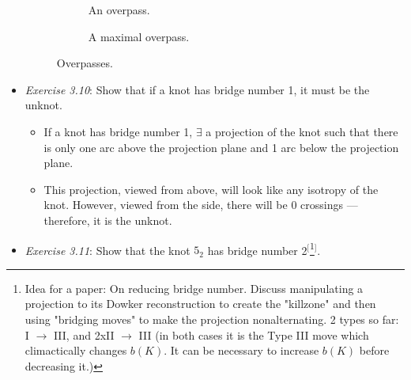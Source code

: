 \documentclass[titlepage]{article}
\numberwithin{figure}{section}
\numberwithin{table}{section}
\numberwithin{equation}{section}
\begin{document}
\begin{itemize}
\begin{figure}[h!]
\begin{subfigure}[b]{0.4\linewidth}
            \caption{An overpass.}
            \label{fig:overpassa}
        \end{subfigure}
        \begin{subfigure}[b]{0.4\linewidth}
            \centering
            \caption{A maximal overpass.}
            \label{fig:overpassb}
        \end{subfigure}
        \caption{Overpasses.}
        \label{fig:overpass}
    \end{figure}
    \item \emph{Exercise 3.10}: Show that if a knot has bridge number 1, it must be the unknot.
    \begin{itemize}
        \item If a knot has bridge number 1, $\exists$ a projection of the knot such that there is only one arc above the projection plane and 1 arc below the projection plane.
        \item This projection, viewed from above, will look like any isotropy of the knot. However, viewed from the side, there will be 0 crossings --- therefore, it is the unknot.
    \end{itemize}
    \item \emph{Exercise 3.11}: Show that the knot $5_2$ has bridge number 2$^[$\footnote{Idea for a paper: On reducing bridge number. Discuss manipulating a projection to its Dowker reconstruction to create the "killzone" and then using "bridging moves" to make the projection nonalternating. 2 types so far: I $\rightarrow$ III, and 2xII $\rightarrow$ III (in both cases it is the Type III move which climactically changes $b(K)$. It can be necessary to increase $b(K)$ before decreasing it.)}$^]$.

\end{itemize}
\end{document}
